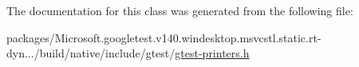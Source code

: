 The documentation for this class was generated from the following file\+:\begin{DoxyCompactItemize}
\item 
packages/\+Microsoft.\+googletest.\+v140.\+windesktop.\+msvcstl.\+static.\+rt-\/dyn.../build/native/include/gtest/\mbox{\hyperlink{gtest-printers_8h}{gtest-\/printers.\+h}}\end{DoxyCompactItemize}
